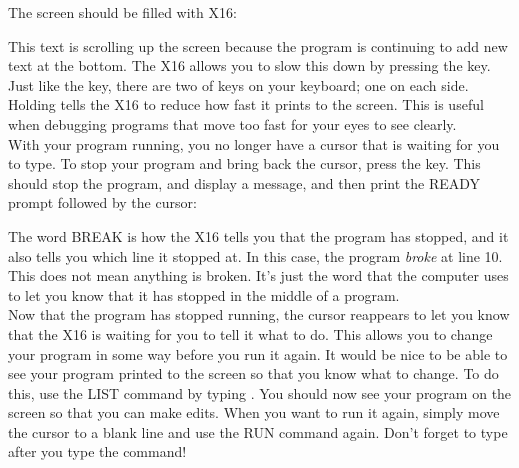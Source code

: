 The screen should be filled with {\ttfamily X16}:\\

\begin{center}
\end{center}

This text is scrolling up the screen because the program is continuing to add
new text at the bottom.  The X16 allows you to slow this down by pressing the
\ctrlkey key.  Just like the \shiftkey key, there are two of \ctrlkey
keys on your keyboard; one on each side.  Holding \ctrlkey tells the X16 to
reduce how fast it prints to the screen.  This is useful when debugging
programs that move too fast for your eyes to see clearly.\\

With your program running, you no longer have a cursor that is waiting for you
to type.  To stop your program and bring back the cursor, press the \runstopkey
key.  This should stop the program, and display a message, and then print the
{\ttfamily READY} prompt followed by the cursor:

\begin{center}
\end{center}

The word {\ttfamily BREAK} is how the X16 tells you that the program has
stopped, and it also tells you which line it stopped at.  In this case, the
program \emph{broke} at line 10.  This does not mean anything is broken.  It's
just the word that the computer uses to let you know that it has stopped in the
middle of a program.\\

Now that the program has stopped running, the cursor reappears to let you know
that the X16 is waiting for you to tell it what to do.  This allows you to
change your program in some way before you run it again.  It would be nice to
be able to see your program printed to the screen so that you know what to
change.  To do this, use the {\ttfamily LIST} command by typing
\returnkey.  You should now see your program on the screen so that you can make
edits.  When you want to run it again, simply move the cursor to a blank line
and use the {\ttfamily RUN} command again.  Don't forget to type
 after you type the command!

